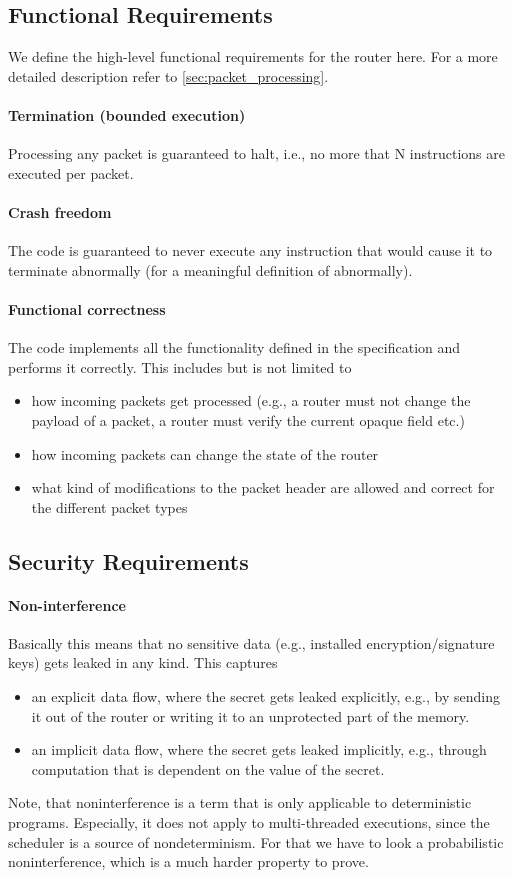 \subsection{Functional Requirements}
We define the high-level functional requirements for the router here. For a 
more detailed description refer to \autoref{sec:packet_processing}.

\paragraph{Termination (bounded execution)}
Processing any packet is guaranteed to halt, i.e., no more that N 
instructions are executed per packet.

\paragraph{Crash freedom}
The code is guaranteed to never execute any instruction that would cause it 
to terminate abnormally (for a meaningful definition of abnormally).

\paragraph{Functional correctness}
The code implements all the functionality defined in the specification and 
performs it correctly. This includes but is not limited to
\begin{itemize}
	\item how incoming packets get processed (e.g., a router must not 
	change the payload of a packet, a router must verify the current opaque 
	field etc.)
	\item how incoming packets can change the state of the router
	\item what kind of modifications to the packet header are allowed and 
	correct for the different packet types
\end{itemize}

\subsection{Security Requirements}
\paragraph{Non-interference}
Basically this means that no sensitive data (e.g., installed 
encryption/signature keys) gets leaked in any kind. This captures 
\begin{itemize}
	\item an explicit data flow, where the secret gets leaked explicitly, e.g., 
	by sending it out of the router or writing it to an unprotected part of the 
	memory.
	\item an implicit data flow, where the secret gets leaked implicitly, e.g., 
	through computation that is dependent on the value of the secret.
\end{itemize}
Note, that noninterference is a term that is only applicable to deterministic 
programs.
Especially, it does not apply to multi-threaded executions, since the 
scheduler is a source of nondeterminism. For that we have to look a 
probabilistic noninterference, which is a much harder property to prove.

